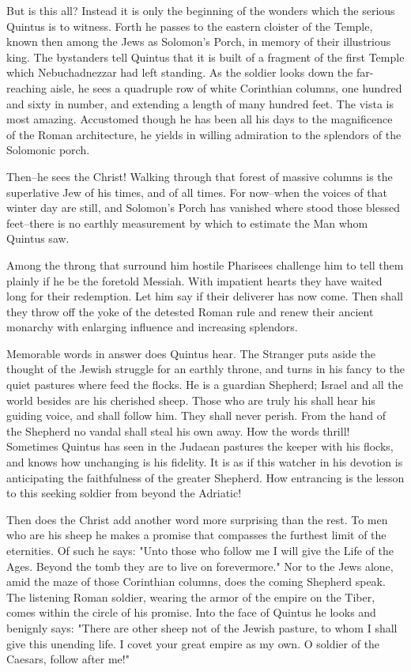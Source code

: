 But is this all?  Instead it is only the beginning of the wonders
which the serious Quintus is to witness.  Forth he passes to the
eastern cloister of the Temple, known then among the Jews as
Solomon's Porch, in memory of their illustrious king.  The
bystanders tell Quintus that it is built of a fragment of the first
Temple which Nebuchadnezzar had left standing.  As the soldier
looks down the far-reaching aisle, he sees a quadruple row of white
Corinthian columns, one hundred and sixty in number, and extending
a length of many hundred feet.  The vista is most amazing.
Accustomed though he has been all his days to the magnificence of
the Roman architecture, he yields in willing admiration to the
splendors of the Solomonic porch.

Then--he sees the Christ!  Walking through that forest of massive
columns is the superlative Jew of his times, and of all times.  For
now--when the voices of that winter day are still, and Solomon's
Porch has vanished where stood those blessed feet--there is no
earthly measurement by which to estimate the Man whom Quintus saw.


Among the throng that surround him hostile Pharisees challenge him
to tell them plainly if he be the foretold Messiah.  With impatient
hearts they have waited long for their redemption.  Let him say if
their deliverer has now come.  Then shall they throw off the yoke
of the detested Roman rule and renew their ancient monarchy with
enlarging influence and increasing splendors.

Memorable words in answer does Quintus hear.  The Stranger  puts
aside  the thought of the Jewish struggle for an earthly throne,
and turns in his fancy to the quiet pastures where feed the flocks.
He is a guardian Shepherd; Israel and all the world besides are his
cherished sheep.  Those who are truly his shall hear his guiding
voice, and shall follow him.  They shall never perish.  From the
hand of the Shepherd no vandal shall steal his own away.  How the
words thrill!  Sometimes Quintus has seen in the Judaean pastures
the keeper with his flocks, and knows how unchanging is his
fidelity.  It is as if this watcher in his devotion is anticipating
the faithfulness of the greater Shepherd.  How entrancing is the
lesson to this seeking soldier from beyond the Adriatic!

Then does the Christ add another word more surprising than the
rest.  To men who are his sheep he makes a promise that compasses
the furthest limit of the eternities.  Of such he says: "Unto those
who follow me I will give the Life of the Ages.  Beyond the tomb
they are to live on forevermore."  Nor to the Jews alone, amid the
maze of those Corinthian columns, does the coming Shepherd speak.
The listening Roman soldier, wearing the armor of the empire on the
Tiber, comes within the circle of his promise.  Into the face of
Quintus he looks and benignly says: "There are other sheep not of
the Jewish pasture, to whom I shall give this unending life.  I
covet your great empire as my own.  O soldier of the Caesars,
follow after me!"


